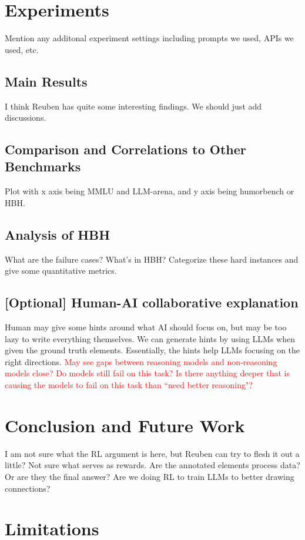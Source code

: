 \documentclass[11pt]{article}
\begin{document}
\section{Experiments}
Mention any additonal experiment settings including prompts we used, APIs we used, etc.

\subsection{Main Results}
I think Reuben has quite some interesting findings. We should just add discussions.

\subsection{Comparison and Correlations to Other Benchmarks}
Plot with x axis being MMLU and LLM-arena, and y axis being humorbench or HBH.

\subsection{Analysis of HBH}
What are the failure cases? What's in HBH? Categorize these hard instances and give some quantitative metrics.

\subsection{[Optional] Human-AI collaborative explanation}
Human may give some hints around what AI should focus on, but may be too lazy to write everything themselves. We can generate hints by using LLMs when given the ground truth elements. Essentially, the hints help LLMs focusing on the right directions. \textcolor{red}{May see gaps between reasoning models and non-reasoning models close? Do models still fail on this task? Is there anything deeper that is causing the models to fail on this task than ``need better reasoning"?}

\section{Conclusion and Future Work}
I am not sure what the RL argument is here, but Reuben can try to flesh it out a little? Not sure what serves as rewards. Are the annotated elements process data? Or are they the final answer? Are we doing RL to train LLMs to better drawing connections? 


\newpage
\section*{Limitations}
\end{document}

